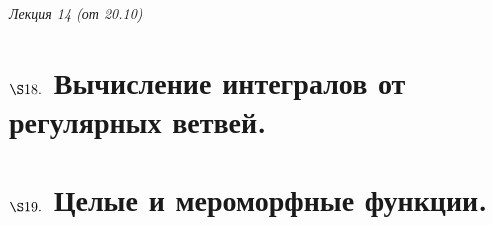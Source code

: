 \begin{flushright}
    \textit{Лекция 14 (от 20.10)}
\end{flushright}
\section{$\S 18.$ Вычисление интегралов от регулярных ветвей.}
\section{$\S 19.$ Целые и мероморфные функции.}
